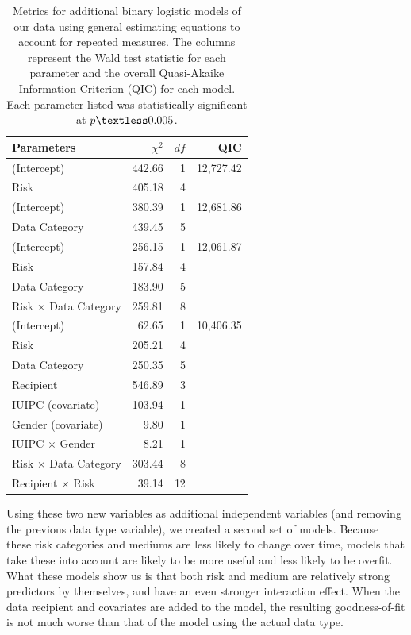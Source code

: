 \documentclass[conference]{IEEEtran}
\begin{document}
\begin{table}[t]
\centering
\begin{tabular}{|l| r| r| r|}
\hline
Parameters & $\chi^2$ & $df$ & QIC\\
\hline
\hline
(Intercept) & 442.66 & 1 & 12,727.42\\
Risk & 405.18 & 4 & \\
\hline
(Intercept) & 380.39 & 1 & 12,681.86\\
Data Category & 439.45 & 5 & \\
\hline
(Intercept) & 256.15 & 1 & 12,061.87\\
Risk & 157.84 & 4 & \\
Data Category & 183.90 & 5 & \\
Risk $\times$ Data Category & 259.81 & 8 & \\
\hline
(Intercept) & 62.65 & 1 & 10,406.35\\
Risk & 205.21 & 4 & \\
Data Category & 250.35 & 5 & \\
Recipient & 546.89 & 3 & \\
IUIPC (covariate) & 103.94 & 1 & \\
Gender (covariate) & 9.80 & 1 & \\
IUIPC $\times$ Gender & 8.21 & 1 & \\
Risk $\times$ Data Category & 303.44 & 8 & \\
Recipient $\times$ Risk & 39.14 & 12 & \\
\hline
\end{tabular}
\caption{Metrics for additional binary logistic models of our data using general estimating equations to account for repeated measures. The columns represent the Wald test statistic for each parameter and the overall Quasi-Akaike Information Criterion (QIC) for each model. Each parameter listed was statistically significant at $p\textless0.005$.}
\label{regression2}
\end{table}

Using these two new variables as additional independent variables (and removing the previous data type variable), we created a second set of models. Because these risk categories and mediums are less likely to change over time, models that take these into account are likely to be more useful and less likely to be overfit. What these models show us is that both risk and medium are relatively strong predictors by themselves, and have an even stronger interaction effect. When the data recipient and covariates are added to the model, the resulting goodness-of-fit is not much worse than that of the model using the actual data type. 
\end{document}
